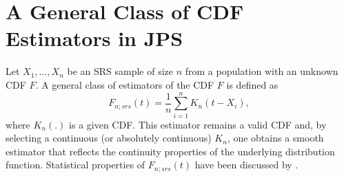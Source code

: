\documentclass[twoside]{article}
\begin{document}


\section{A General Class of CDF Estimators in JPS}\label{Sec2}
Let $X_1, \ldots, X_n$ be an SRS sample of size $n$ from a population with an unknown CDF $F$. A general class of estimators of the CDF $F$ is defined as
\begin{equation*}
F_{n;srs}\left(t\right)=\frac{1}{n}\sum \limits_{i=1}^n K_n\left(t-X_i\right),
\end{equation*}
where $K_n\left(.\right)$ is a given CDF. 
This estimator remains a valid CDF and, by selecting a continuous (or absolutely continuous) $K_n$, one obtains a smooth estimator that reflects the continuity properties of the underlying distribution function.
Statistical properties of   $F_{n;srs}\left(t\right)$   have been discussed by \cite{yamato1973uniform}.
\end{document}
